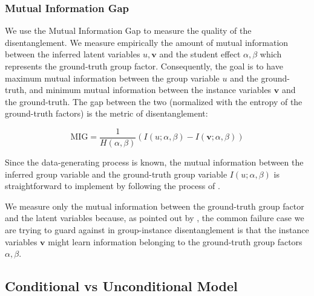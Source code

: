 \documentclass[nohyperref]{article}
\theoremstyle{plain}
\theoremstyle{definition}
\theoremstyle{remark}
\begin{document}
\subsubsection{Mutual Information Gap}
\label{mig}

We use the Mutual Information Gap \citep{Chen2018IsolatingSO} to measure the quality of the disentanglement. We measure empirically the amount of mutual information between the inferred latent variables $u,  \mathbf{v}$ and the student effect $\alpha, \beta$ which represents the ground-truth group factor. Consequently, the goal is to have maximum mutual information between the group variable $u$ and the ground-truth, and minimum mutual information between the instance variables $\mathbf{v}$ and the ground-truth.  The gap between the two (normalized with the entropy of the ground-truth factors) is the metric of disentanglement:

\begin{equation}
\mathrm{MIG} = \frac{1}{H(\alpha, \beta)} (I(u; \alpha, \beta) - I(\mathbf{v}; \alpha, \beta))
\end{equation}

Since the data-generating process is known, the mutual information between the inferred group variable and the ground-truth group variable $I(u; \alpha, \beta)$ is straightforward to implement by following the process of \citet{Chen2018IsolatingSO}.

We measure only the mutual information between the ground-truth group factor and the latent variables because,  as pointed out by \citet{Nmeth2020AdversarialDW}, the common failure case we are trying to guard against in group-instance disentanglement is that the instance variables $\mathbf{v}$ might learn information belonging to the ground-truth group factors $\alpha, \beta$.

\subsection{Conditional vs Unconditional Model}
\end{document}
